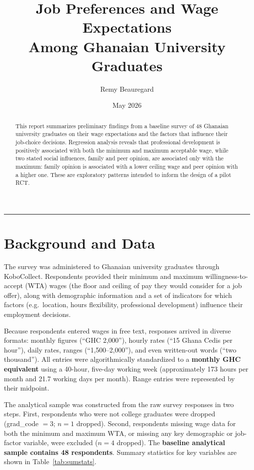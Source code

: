\documentclass[12pt]{article}
\title{\textbf{Job Preferences and Wage Expectations\\Among Ghanaian University Graduates}}
\author{Remy Beauregard}
\date{May 2026}
\begin{document}
\maketitle

\begin{abstract}
\noindent
This report summarizes preliminary findings from a baseline survey of 48 Ghanaian
university graduates on their wage expectations and the factors that influence their
job-choice decisions. Regression analysis reveals that professional development is positively associated
with both the minimum and maximum acceptable wage, while two stated social influences,
family and peer opinion, are associated only with the maximum: family opinion is
associated with a lower ceiling wage and peer opinion with a higher one. These are
exploratory patterns intended to inform the design of a pilot RCT.
\end{abstract}

\vspace{1em}
\hrule
\vspace{1.5em}


\section{Background and Data}

The survey was administered to Ghanaian university graduates through KoboCollect.
Respondents provided their minimum and maximum willingness-to-accept (WTA) wages
(the floor and ceiling of pay they would consider for a job offer), along with
demographic information and a set of indicators for which factors (e.g.\ location,
hours flexibility, professional development) influence their employment decisions.

Because respondents entered wages in free text, responses arrived in diverse
formats: monthly figures (``GHC 2,000''), hourly rates (``15 Ghana Cedis per hour''),
daily rates, ranges (``1,500--2,000''), and even written-out words (``two thousand'').
All entries were algorithmically standardized  to a \textbf{monthly GHC equivalent}
using a 40-hour, five-day working week (approximately 173 hours per month and
21.7 working days per month). Range entries were represented by their midpoint.

The analytical sample was constructed from the raw survey responses in two steps.
First, respondents who were not college graduates were dropped (grad\_code $= 3$;
$n = 1$ dropped). Second, respondents missing wage data for both the
minimum and maximum WTA, or missing any key demographic or job-factor variable, were
excluded ($n = 4$ dropped). The \textbf{baseline analytical sample
contains 48 respondents}. Summary statistics for key variables are shown in
Table~\ref{tab:sumstats}.
\end{document}
